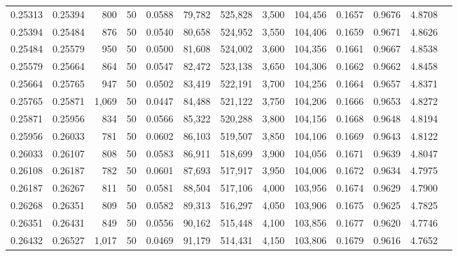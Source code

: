 \begin{tabular}{rrrrrrrrrrrrr}
0.25313 & 0.25394 &   800 &  50 &                                     0.0588 &  79,782 & 525,828 &   3,500 & 104,456 & 0.1657 & 0.9676 & 4.8708 \\
0.25394 & 0.25484 &   876 &  50 &                                     0.0540 &  80,658 & 524,952 &   3,550 & 104,406 & 0.1659 & 0.9671 & 4.8626 \\
0.25484 & 0.25579 &   950 &  50 &                                     0.0500 &  81,608 & 524,002 &   3,600 & 104,356 & 0.1661 & 0.9667 & 4.8538 \\
0.25579 & 0.25664 &   864 &  50 &                                     0.0547 &  82,472 & 523,138 &   3,650 & 104,306 & 0.1662 & 0.9662 & 4.8458 \\
0.25664 & 0.25765 &   947 &  50 &                                     0.0502 &  83,419 & 522,191 &   3,700 & 104,256 & 0.1664 & 0.9657 & 4.8371 \\
0.25765 & 0.25871 & 1,069 &  50 &                                     0.0447 &  84,488 & 521,122 &   3,750 & 104,206 & 0.1666 & 0.9653 & 4.8272 \\
0.25871 & 0.25956 &   834 &  50 &                                     0.0566 &  85,322 & 520,288 &   3,800 & 104,156 & 0.1668 & 0.9648 & 4.8194 \\
0.25956 & 0.26033 &   781 &  50 &                                     0.0602 &  86,103 & 519,507 &   3,850 & 104,106 & 0.1669 & 0.9643 & 4.8122 \\
0.26033 & 0.26107 &   808 &  50 &                                     0.0583 &  86,911 & 518,699 &   3,900 & 104,056 & 0.1671 & 0.9639 & 4.8047 \\
0.26108 & 0.26187 &   782 &  50 &                                     0.0601 &  87,693 & 517,917 &   3,950 & 104,006 & 0.1672 & 0.9634 & 4.7975 \\
0.26187 & 0.26267 &   811 &  50 &                                     0.0581 &  88,504 & 517,106 &   4,000 & 103,956 & 0.1674 & 0.9629 & 4.7900 \\
0.26268 & 0.26351 &   809 &  50 &                                     0.0582 &  89,313 & 516,297 &   4,050 & 103,906 & 0.1675 & 0.9625 & 4.7825 \\
0.26351 & 0.26431 &   849 &  50 &                                     0.0556 &  90,162 & 515,448 &   4,100 & 103,856 & 0.1677 & 0.9620 & 4.7746 \\
0.26432 & 0.26527 & 1,017 &  50 &                                     0.0469 &  91,179 & 514,431 &   4,150 & 103,806 & 0.1679 & 0.9616 & 4.7652 \\

\end{tabular}
